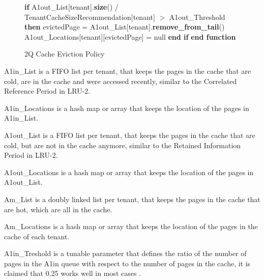 \begin{figure}[htbp]
\begin{minipage}{\linewidth}
\begin{algorithm}[H]
\begin{algorithmic}
            \STATE \hspace{\algorithmicindent} \hspace{\algorithmicindent} \textbf{if} A1out\_List[tenant].\textbf{size}() / TenantCacheSizeRecommendation[tenant] $>$ A1out\_Threshold \textbf{then}
            \STATE \hspace{\algorithmicindent} \hspace{\algorithmicindent} \hspace{\algorithmicindent} evictedPage = A1out\_List[tenant].\textbf{remove\_from\_tail}()
            \STATE \hspace{\algorithmicindent} \hspace{\algorithmicindent} \hspace{\algorithmicindent} A1out\_Locations[tenant][evictedPage] = null
            \STATE \hspace{\algorithmicindent} \hspace{\algorithmicindent} \textbf{end if}
            \STATE \textbf{end function}
        \end{algorithmic}
    \end{algorithm}
    \caption{2Q Cache Eviction Policy}
    \label{fig:2q}
    \end{minipage}
\end{figure}

\newpage

A1in\_List is a FIFO list per tenant, that keeps the pages in the cache that are cold, are
in the cache and were accessed recently, similar to the Correlated Reference Period in LRU-2.

A1in\_Locations is a hash map or array that keeps the location of the pages in A1in\_List.  

A1out\_List is a FIFO list per tenant, that keeps the pages in the cache that are cold, but
are not in the cache anymore, similar to the Retained Information Period in LRU-2.

A1out\_Locations is a hash map or array that keeps the location of the pages in A1out\_List.

Am\_List is a doubly linked list per tenant, that keeps the pages in the cache that are hot,
which are all in the cache.

Am\_Locations is a hash map or array that keeps the location of the pages in the cache of each
tenant.

A1in\_Treshold is a tunable parameter that defines the ratio of the number of pages in the A1in
queue with respect to the number of pages in the cache, it is claimed that 0.25 works well in
most cases \cite{2q-article}.

